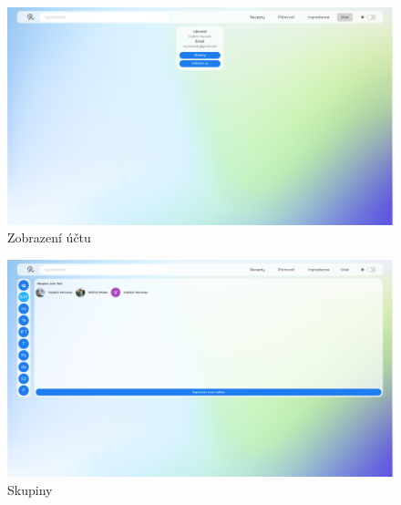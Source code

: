 \begin{figure}[H]
    \includegraphics[width=\textwidth]{images/final-look/ucet}
    \caption{Zobrazení účtu} \label{picture:recipeo:ucet}
\end{figure}

\begin{figure}[H]
    \includegraphics[width=\textwidth]{images/final-look/skupiny}
    \caption{Skupiny} \label{picture:recipeo:skupiny}
\end{figure}
